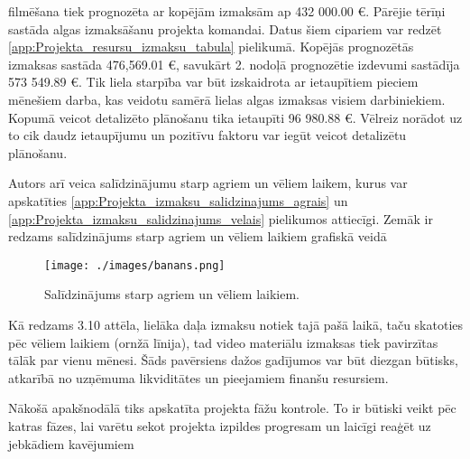filmēšana tiek prognozēta ar kopējām izmaksām ap 432 000.00 €. Pārējie tērīņi sastāda algas 
izmaksāšanu projekta komandai. Datus šiem cipariem var redzēt \ref{app:Projekta_resursu_izmaksu_tabula}
pielikumā. Kopējās prognozētās izmaksas sastāda 476,569.01 €, savukārt 2. nodoļā prognozētie izdevumi
sastādīja 573 549.89 €. Tik liela starpība var būt izskaidrota ar ietaupītiem pieciem mēnešiem
darba, kas veidotu samērā lielas algas izmaksas visiem darbiniekiem. Kopumā veicot detalizēto
plānošanu tika ietaupīti 96 980.88 €. Vēlreiz norādot uz to cik daudz ietaupījumu un pozitīvu faktoru 
var iegūt veicot detalizētu plānošanu.
\par
Autors arī veica salīdzinājumu starp agriem un vēliem laikem, kurus var apskatīties
\ref{app:Projekta_izmaksu_salidzinajums_agrais} un \ref{app:Projekta_izmaksu_salidzinajums_velais}
pielikumos attiecīgi. Zemāk ir redzams salīdzinājums starp agriem un vēliem laikiem grafiskā veidā
\par
\begin{figure}[h!]
  \centering
  \texttt{[image: ./images/banans.png]}
  \caption{Salīdzinājums starp agriem un vēliem laikiem.}
\end{figure}
\par
Kā redzams 3.10 attēla, lielāka daļa izmaksu notiek tajā pašā laikā, taču skatoties
pēc vēliem laikiem (ornžā līnija), tad video materiālu izmaksas tiek pavirzītas tālāk par vienu mēnesi.
Šāds pavērsiens dažos gadījumos var būt diezgan būtisks, atkarībā no uzņēmuma likviditātes un 
pieejamiem finanšu resursiem.
\par
Nākošā apakšnodālā tiks apskatīta projekta fāžu kontrole. To ir būtiski veikt pēc katras fāzes,
lai varētu sekot projekta izpildes progresam un laicīgi reaģēt uz jebkādiem kavējumiem
